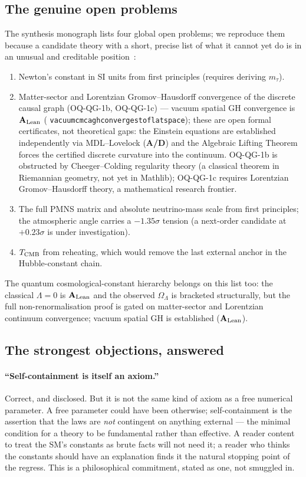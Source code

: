 \documentclass[11pt]{article}
\newcommand{\lean}[1]{%
  \penalty-100
  \begingroup\def\_{\textunderscore\allowbreak}\texttt{#1}\endgroup}
\newcommand{\CatAL}{\ensuremath{\textbf{A}_{\rm Lean}}}
\newcommand{\CatAD}{\textbf{A/D}}
\begin{document}
\subsection{The genuine open problems}

The synthesis monograph lists four global open problems; we reproduce them because a
candidate theory with a short, precise list of what it cannot yet do is in an
unusual and creditable position~\cite{SpivackGTECompleteFramework}:
\begin{enumerate}[leftmargin=1.8em,itemsep=2pt]
\item Newton's constant in SI units from first principles (requires deriving
  $m_\tau$).
\item Matter-sector and Lorentzian Gromov--Hausdorff convergence of the discrete causal
  graph (OQ-QG-1b, OQ-QG-1c) --- vacuum spatial GH convergence is \CatAL{}
  (\lean{vacuum\_cmca\_gh\_converges\_to\_flat\_space}); these are open formal certificates,
  not theoretical gaps: the Einstein equations are established independently via
  MDL--Lovelock (\CatAD) and the Algebraic Lifting Theorem forces the certified discrete
  curvature into the continuum.  OQ-QG-1b is obstructed by Cheeger--Colding regularity
  theory (a classical theorem in Riemannian geometry, not yet in Mathlib); OQ-QG-1c
  requires Lorentzian Gromov--Hausdorff theory, a mathematical research frontier.
\item The full PMNS matrix and absolute neutrino-mass scale from first principles;
  the atmospheric angle carries a $-1.35\sigma$ tension (a next-order candidate at
  $+0.23\sigma$ is under investigation).
\item $T_{\rm CMB}$ from reheating, which would remove the last external anchor in
  the Hubble-constant chain.
\end{enumerate}
The quantum cosmological-constant hierarchy belongs on this list too: the classical
$\Lambda = 0$ is \CatAL{} and the observed $\Omega_\Lambda$ is bracketed
structurally, but the full non-renormalisation proof is gated on matter-sector and
Lorentzian continuum convergence; vacuum spatial GH is established (\CatAL).

\subsection{The strongest objections, answered}

\paragraph{``Self-containment is itself an axiom.''}  Correct, and disclosed.  But
it is not the same kind of axiom as a free numerical parameter.  A free parameter
could have been otherwise; self-containment is the assertion that the laws are
\emph{not} contingent on anything external --- the minimal condition for a theory to
be fundamental rather than effective.  A reader content to treat the SM's constants
as brute facts will not need it; a reader who thinks the constants should have an
explanation finds it the natural stopping point of the regress.  This is a
philosophical commitment, stated as one, not smuggled in.
\end{document}
